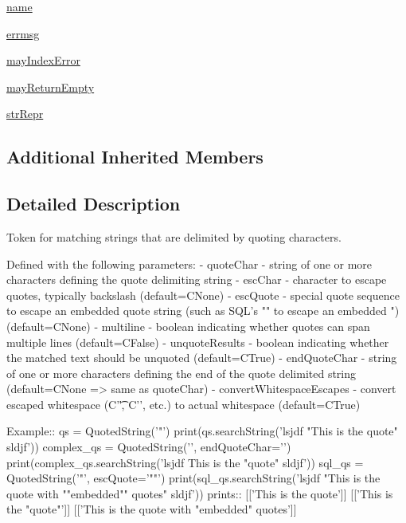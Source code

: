 \begin{DoxyCompactItemize}
\hyperlink{classsetuptools_1_1__vendor_1_1pyparsing_1_1QuotedString_a4206ce0bc9639ddb0b774a63e40e6082}{name}
\item 
\hyperlink{classsetuptools_1_1__vendor_1_1pyparsing_1_1QuotedString_aedd76bf0918cc2f46d360210c92ee200}{errmsg}
\item 
\hyperlink{classsetuptools_1_1__vendor_1_1pyparsing_1_1QuotedString_afd19c6f1edd9d3d7d91fbcd549024d9b}{may\+Index\+Error}
\item 
\hyperlink{classsetuptools_1_1__vendor_1_1pyparsing_1_1QuotedString_a9baa8a91aa1d0a4ce7632a03a02e9d1a}{may\+Return\+Empty}
\item 
\hyperlink{classsetuptools_1_1__vendor_1_1pyparsing_1_1QuotedString_af287602ba07146fed1d14aa7db93fe14}{str\+Repr}
\end{DoxyCompactItemize}
\subsection*{Additional Inherited Members}


\subsection{Detailed Description}
\begin{DoxyVerb}Token for matching strings that are delimited by quoting characters.

Defined with the following parameters:
    - quoteChar - string of one or more characters defining the quote delimiting string
    - escChar - character to escape quotes, typically backslash (default=C{None})
    - escQuote - special quote sequence to escape an embedded quote string (such as SQL's "" to escape an embedded ") (default=C{None})
    - multiline - boolean indicating whether quotes can span multiple lines (default=C{False})
    - unquoteResults - boolean indicating whether the matched text should be unquoted (default=C{True})
    - endQuoteChar - string of one or more characters defining the end of the quote delimited string (default=C{None} => same as quoteChar)
    - convertWhitespaceEscapes - convert escaped whitespace (C{'\t'}, C{'\n'}, etc.) to actual whitespace (default=C{True})

Example::
    qs = QuotedString('"')
    print(qs.searchString('lsjdf "This is the quote" sldjf'))
    complex_qs = QuotedString('{{', endQuoteChar='}}')
    print(complex_qs.searchString('lsjdf {{This is the "quote"}} sldjf'))
    sql_qs = QuotedString('"', escQuote='""')
    print(sql_qs.searchString('lsjdf "This is the quote with ""embedded"" quotes" sldjf'))
prints::
    [['This is the quote']]
    [['This is the "quote"']]
    [['This is the quote with "embedded" quotes']]
\end{DoxyVerb}
 


